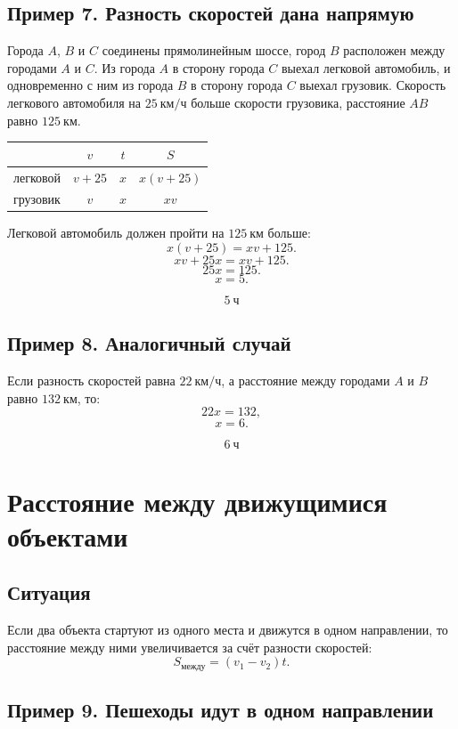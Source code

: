 \documentclass[a4paper,12pt]{article}
\newcommand{\kmh}{\text{км/ч}}
\newcommand{\km}{\text{км}}
\newcommand{\ch}{\text{ч}}
\begin{document}
\subsection{Пример 7. Разность скоростей дана напрямую}

Города $A$, $B$ и $C$ соединены прямолинейным шоссе, город $B$ расположен между городами $A$ и $C$. Из города $A$ в сторону города $C$ выехал легковой автомобиль, и одновременно с ним из города $B$ в сторону города $C$ выехал грузовик. Скорость легкового автомобиля на $25\ \kmh$ больше скорости грузовика, расстояние $AB$ равно $125\ \km$.

\begin{center}
\renewcommand{\arraystretch}{1.35}
\begin{tabularx}{0.75\linewidth}{X c c c}
\toprule
 & $v$ & $t$ & $S$ \\
\midrule
легковой & $v+25$ & $x$ & $x(v+25)$ \\
грузовик & $v$ & $x$ & $xv$ \\
\bottomrule
\end{tabularx}
\end{center}

Легковой автомобиль должен пройти на $125\ \km$ больше:
\[
x(v+25)=xv+125.
\]
\[
xv+25x=xv+125.
\]
\[
25x=125.
\]
\[
x=5.
\]

\[
\boxed{5\ \ch}
\]

\subsection{Пример 8. Аналогичный случай}

Если разность скоростей равна $22\ \kmh$, а расстояние между городами $A$ и $B$ равно $132\ \km$, то:
\[
22x=132,
\]
\[
x=6.
\]

\[
\boxed{6\ \ch}
\]

\section{Расстояние между движущимися объектами}

\subsection{Ситуация}

Если два объекта стартуют из одного места и движутся в одном направлении, то расстояние между ними увеличивается за счёт разности скоростей:
\[
S_{\text{между}}=(v_1-v_2)t.
\]

\subsection{Пример 9. Пешеходы идут в одном направлении}
\end{document}
